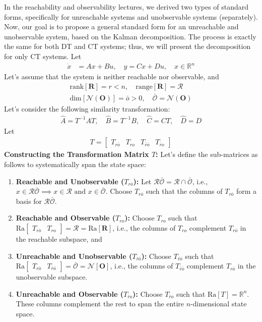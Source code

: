 \documentclass[twoside, 11pt, a4paper]{article}
\begin{document}
In the reachability and observability lectures, we derived two types of standard forms, 
specifically for unreachable systems and unobservable systems (separately). Now, our goal is
to propose a general standard form for an unreachable and unobservable system, based on
the Kalman decomposition. The process is exactly the same for both DT and CT systems; thus, 
we will present the decomposition for only CT systems. Let
%
\begin{align*}
  \dot{x} &= A x + B u , \quad y = C x + D u , \quad x \in \mathbb{R}^n
\end{align*}
%
Let's assume that the system is neither reachable nor observable, and
%
\begin{align*}
  \mathrm{rank}[ \mathbf{R} ] = r < n , \quad \mathrm{range}[ \mathbf{R} ] = \mathcal{R}
  \\
  \mathrm{dim}[ \mathcal{N} ( \mathbf{O} ) ] = \bar{o} > 0 , \quad \bar{\mathcal{O}} = \mathcal{N} ( \mathbf{O} )
\end{align*}
%
Let's consider the following similarity transformation:
%
\begin{align*}
  \hat{A} = T^{-1} A T , \quad \hat{B} = T^{-1} B , \quad \hat{C} = C T , \quad \hat{D} = D
\end{align*}
%
Let  
%
\begin{align*}
  T = \left[ \begin{array}{c|c|c|c} T_{r\bar{o}} & T_{ro} & T_{\bar{r} \bar{o}} & T_{\bar{r} o} \end{array} \right]
\end{align*}
%
\textbf{Constructing the Transformation Matrix $T$:}
Let's define the sub-matrices as follows to systematically span the state space:
%
\begin{enumerate}
\item \textbf{Reachable and Unobservable ($T_{r\bar{o}}$):} Let $\mathcal{R}\bar{\mathcal{O}} = \mathcal{R} \cap \bar{\mathcal{O}}$, i.e., 
$x \in \mathcal{R}\bar{\mathcal{O}} \implies x \in \mathcal{R} \text{ and } x \in \bar{\mathcal{O}}$. 
Choose $T_{r\bar{o}}$ such that the columns of $T_{r\bar{o}}$ form a basis for $\mathcal{R}\bar{\mathcal{O}}$.
%
\item \textbf{Reachable and Observable ($T_{ro}$):} Choose $T_{ro}$ such that $\mathrm{Ra}\left[ \begin{array}{c|c} T_{r\bar{o}} & T_{ro} \end{array} \right] = \mathcal{R} = \mathrm{Ra}[\mathbf{R}]$, i.e., the columns of $T_{ro}$ complement $T_{r\bar{o}}$ in the reachable subspace, and  
%
\item \textbf{Unreachable and Unobservable ($T_{\bar{r}\bar{o}}$):} Choose $T_{\bar{r}\bar{o}}$ such that $\mathrm{Ra}\left[ \begin{array}{c|c} T_{r\bar{o}} & T_{\bar{r}\bar{o}} \end{array} \right] = \bar{\mathcal{O}} = \mathcal{N}[ \mathbf{O} ]$,
i.e., the columns of $T_{\bar{r}\bar{o}}$ complement $T_{r\bar{o}}$ in the unobservable subspace.
%
\item \textbf{Unreachable and Observable ($T_{\bar{r}o}$):} Choose $T_{\bar{r}o}$ such that $\mathrm{Ra}[ T ] = \mathbb{R}^n$. These columns complement the rest to span the entire $n$-dimensional state space.
%
\end{enumerate}
\end{document}
